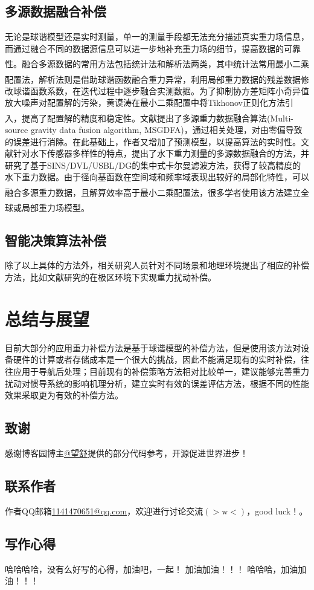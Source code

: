 \documentclass[12pt,a4,utf8]{article}
\newcommand{\upcite}[1]{\textsuperscript{\textsuperscript{\cite{#1}}}} %
\begin{document}
\subsection{多源数据融合补偿}
无论是球谐模型还是实时测量，单一的测量手段都无法充分描述真实重力场信息，而通过融合不同的数据源信息可以进一步地补充重力场的细节，提高数据的可靠性\upcite{DKXB20050100F}。融合多源数据的常用方法包括统计法和解析法两类\upcite{1020160654.nh}，其中统计法常用最小二乘配置法，解析法则是借助球谐函数融合重力异常\upcite{kern2003analysis,2009059209.nh}，利用局部重力数据的残差数据修改球谐函数系数，在迭代过程中逐步融合实测数据。为了抑制协方差矩阵小奇异值放大噪声对配置解的污染，黄谟涛在最小二乘配置中将Tikhonov正则化方法引入\upcite{HYCH201303004}，提高了配置解的精度和稳定性。文献\cite{LUOKAIXIN2023}提出了多源重力数据融合算法(Multi-source gravity data fusion algorithm, MSGDFA)，通过相关处理，对由零偏导致的误差进行消除。在此基础上，作者又增加了预测模型，以提高算法的实时性。文献\cite{1022810006.nh}针对水下传感器多样性的特点，提出了水下重力测量的多源数据融合的方法，并研究了基于SINS/DVL/USBL/DG的集中式卡尔曼滤波方法，获得了较高精度的水下重力数据。由于径向基函数在空间域和频率域表现出较好的局部化特性，可以融合多源重力数据，且解算效率高于最小二乘配置法\upcite{wittwer2009regional}，很多学者使用该方法建立全球或局部重力场模型\upcite{bentel2013different,bentel2016combining,pham2009solutions,klees2008data,CHXB201609003,DQWX201704009,mahbuby2017local,tenzer2008choice}。
\subsection{智能决策算法补偿}

除了以上具体的方法外，相关研究人员针对不同场景和地理环境提出了相应的补偿方法，比如文献\cite{LIQIAN2022}研究的在极区环境下实现重力扰动补偿。
\section{总结与展望}
目前大部分的应用重力补偿方法是基于球谐模型的补偿方法，但是使用该方法对设备硬件的计算或者存储成本是一个很大的挑战，因此不能满足现有的实时补偿，往往应用于导航后处理；目前现有的补偿策略方法相对比较单一，建议能够完善重力扰动对惯导系统的影响机理分析，建立实时有效的误差评估方法，根据不同的性能效果采取更为有效的补偿方法。

\newpage
\subsection{致谢}
感谢博客园博主\href{https://www.cnblogs.com/huangliu1111/p/13625826.html}{@望舒}提供的部分代码参考，开源促进世界进步！
\subsection{联系作者}
作者QQ邮箱\href{https://wx.mail.qq.com/?cancel_login=true&from=get_ticket_fail}{1141470651@qq.com}，欢迎进行讨论交流$(>\text{w}<)$，good luck！。

\subsection{写作心得}
哈哈哈哈，没有么好写的心得，加油吧，一起！
加油加油！！！
哈哈哈，加油加油！！！

\end{document}
